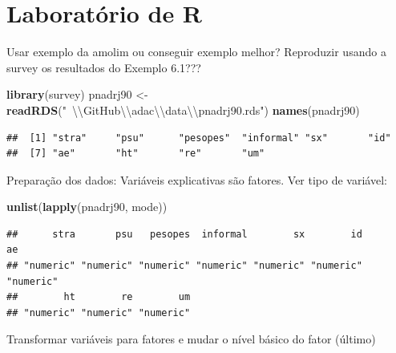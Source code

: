 \documentclass[]{book}
\newenvironment{Shaded}{\begin{snugshade}}{\end{snugshade}}
\newcommand{\KeywordTok}[1]{\textcolor[rgb]{0.13,0.29,0.53}{\textbf{#1}}}
\newcommand{\CharTok}[1]{\textcolor[rgb]{0.31,0.60,0.02}{#1}}
\newcommand{\StringTok}[1]{\textcolor[rgb]{0.31,0.60,0.02}{#1}}
\newcommand{\NormalTok}[1]{#1}
\theoremstyle{definition}
\theoremstyle{definition}
\theoremstyle{definition}
\theoremstyle{remark}
\begin{document}
\section{Laboratório de R}\label{laboratorio-de-r-3}

Usar exemplo da amolim ou conseguir exemplo melhor? Reproduzir usando a
survey os resultados do Exemplo 6.1???

\begin{Shaded}
\begin{Highlighting}[]
\KeywordTok{library}\NormalTok{(survey)}
\NormalTok{pnadrj90 <-}\StringTok{ }\KeywordTok{readRDS}\NormalTok{(}\StringTok{"~}\CharTok{\textbackslash{}\textbackslash{}}\StringTok{GitHub}\CharTok{\textbackslash{}\textbackslash{}}\StringTok{adac}\CharTok{\textbackslash{}\textbackslash{}}\StringTok{data}\CharTok{\textbackslash{}\textbackslash{}}\StringTok{pnadrj90.rds"}\NormalTok{)}
\KeywordTok{names}\NormalTok{(pnadrj90)}
\end{Highlighting}
\end{Shaded}

\begin{verbatim}
##  [1] "stra"     "psu"      "pesopes"  "informal" "sx"       "id"      
##  [7] "ae"       "ht"       "re"       "um"
\end{verbatim}

Preparação dos dados: Variáveis explicativas são fatores. Ver tipo de
variável:

\begin{Shaded}
\begin{Highlighting}[]
\KeywordTok{unlist}\NormalTok{(}\KeywordTok{lapply}\NormalTok{(pnadrj90, mode))}
\end{Highlighting}
\end{Shaded}

\begin{verbatim}
##      stra       psu   pesopes  informal        sx        id        ae 
## "numeric" "numeric" "numeric" "numeric" "numeric" "numeric" "numeric" 
##        ht        re        um 
## "numeric" "numeric" "numeric"
\end{verbatim}

Transformar variáveis para fatores e mudar o nível básico do fator
(último)
\end{document}
